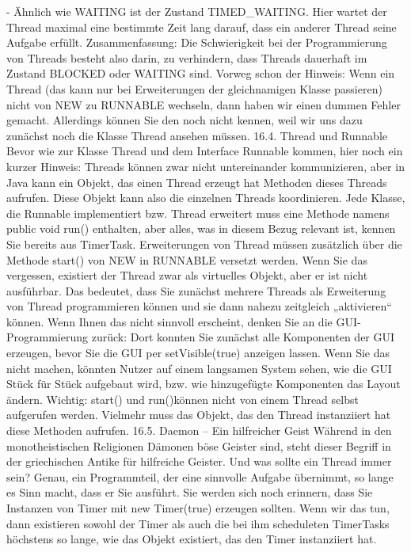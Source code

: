 -	Ähnlich wie WAITING ist der Zustand TIMED_WAITING. Hier wartet der Thread maximal eine bestimmte Zeit lang darauf, dass ein anderer Thread seine Aufgabe erfüllt.
Zusammenfassung:
Die Schwierigkeit bei der Programmierung von Threads besteht also darin, zu verhindern, dass Threads dauerhaft im Zustand BLOCKED oder WAITING sind. 
Vorweg schon der Hinweis: Wenn ein Thread (das kann nur bei Erweiterungen der gleichnamigen Klasse passieren) nicht von NEW zu RUNNABLE wechseln, dann haben wir einen dummen Fehler gemacht. Allerdings können Sie den noch nicht kennen, weil wir uns dazu zunächst noch die Klasse Thread ansehen müssen.
16.4.	Thread und Runnable
Bevor wie zur Klasse Thread und dem Interface Runnable kommen, hier noch ein kurzer Hinweis: Threads können zwar nicht untereinander kommunizieren, aber in Java kann ein Objekt, das einen Thread erzeugt hat Methoden dieses Threads aufrufen. Diese Objekt kann also die einzelnen Threads koordinieren.
Jede Klasse, die Runnable implementiert bzw. Thread erweitert muss eine Methode namens 
public void run() enthalten, aber alles, was in diesem Bezug relevant ist, kennen Sie bereits aus TimerTask.
Erweiterungen von Thread müssen zusätzlich über die Methode start() von NEW in RUNNABLE versetzt werden. Wenn Sie das vergessen, existiert der Thread zwar als virtuelles Objekt, aber er ist nicht ausführbar. Das bedeutet, dass Sie zunächst mehrere Threads als Erweiterung von Thread programmieren können und sie dann nahezu zeitgleich „aktivieren“ können. Wenn Ihnen das nicht sinnvoll erscheint, denken Sie an die GUI-Programmierung zurück: Dort konnten Sie zunächst alle Komponenten der GUI erzeugen, bevor Sie die GUI per setVisible(true) anzeigen lassen. Wenn Sie das nicht machen, könnten Nutzer auf einem langsamen System sehen, wie die GUI Stück für Stück aufgebaut wird, bzw. wie hinzugefügte Komponenten das Layout ändern.
Wichtig: start() und run()können nicht von einem Thread selbst aufgerufen werden. Vielmehr muss das Objekt, das den Thread instanziiert hat diese Methoden aufrufen.
16.5.	Daemon – Ein hilfreicher Geist
Während in den monotheistischen Religionen Dämonen böse Geister sind, steht dieser Begriff in der griechischen Antike für hilfreiche Geister. Und was sollte ein Thread immer sein? Genau, ein Programmteil, der eine sinnvolle Aufgabe übernimmt, so lange es Sinn macht, dass er Sie ausführt.
Sie werden sich noch erinnern, dass Sie Instanzen von Timer mit new Timer(true) erzeugen sollten. Wenn wir das tun, dann existieren sowohl der Timer als auch die bei ihm scheduleten TimerTasks höchstens so lange, wie das Objekt existiert, das den Timer instanziiert hat.
